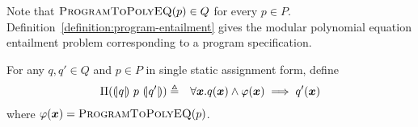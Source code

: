 Note that $\textsc{ProgramToPolyEQ}(p) \in Q$ for every $p \in P$.
Definition~\ref{definition:program-entailment} gives the modular
polynomial equation entailment problem corresponding to a program
specification.
\begin{definition}
  For any $q, q' \in Q$ and $p \in P$ in single static assignment
  form, define
  \begin{eqnarray*}
    \Pi(\hoaretriple{q}{p}{q'}) & \defn &
    \forall \vx. q(\vx) \wedge \varphi(\vx) \implies q'(\vx)
  \end{eqnarray*}
  where $\varphi(\vx) =
  \textsc{ProgramToPolyEQ}(p)$. 
  \label{definition:program-entailment}
\end{definition}

